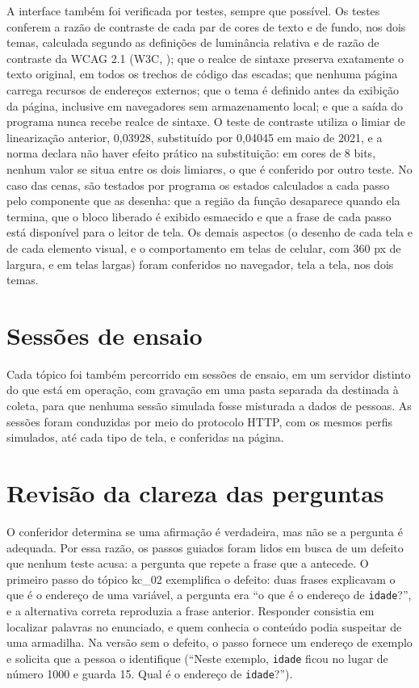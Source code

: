 A interface também foi verificada por testes, sempre que possível. Os testes conferem a razão de contraste de cada par de cores de texto e de fundo, nos dois temas, calculada segundo as definições de luminância relativa e de razão de contraste da WCAG 2.1 (W3C, \citeyear{w3c2025}); que o realce de sintaxe preserva exatamente o texto original, em todos os trechos de código das escadas; que nenhuma página carrega recursos de endereços externos; que o tema é definido antes da exibição da página, inclusive em navegadores sem armazenamento local; e que a saída do programa nunca recebe realce de sintaxe. O teste de contraste utiliza o limiar de linearização anterior, 0,03928, substituído por 0,04045 em maio de 2021, e a norma declara não haver efeito prático na substituição: em cores de 8 bits, nenhum valor se situa entre os dois limiares, o que é conferido por outro teste. No caso das cenas, são testados por programa os estados calculados a cada passo pelo componente que as desenha: que a região da função desaparece quando ela termina, que o bloco liberado é exibido esmaecido e que a frase de cada passo está disponível para o leitor de tela. Os demais aspectos (o desenho de cada tela e de cada elemento visual, e o comportamento em telas de celular, com 360 px de largura, e em telas largas) foram conferidos no navegador, tela a tela, nos dois temas.

\section{Sessões de ensaio}

Cada tópico foi também percorrido em sessões de ensaio, em um servidor distinto do que está em operação, com gravação em uma pasta separada da destinada à coleta, para que nenhuma sessão simulada fosse misturada a dados de pessoas. As sessões foram conduzidas por meio do protocolo HTTP, com os mesmos perfis simulados, até cada tipo de tela, e conferidas na página.

\section{Revisão da clareza das perguntas}

O conferidor determina se uma afirmação é verdadeira, mas não se a pergunta é adequada. Por essa razão, os passos guiados foram lidos em busca de um defeito que nenhum teste acusa: a pergunta que repete a frase que a antecede. O primeiro passo do tópico kc\_02 exemplifica o defeito: duas frases explicavam o que é o endereço de uma variável, a pergunta era ``o que é o endereço de \texttt{idade}?'', e a alternativa correta reproduzia a frase anterior. Responder consistia em localizar palavras no enunciado, e quem conhecia o conteúdo podia suspeitar de uma armadilha. Na versão sem o defeito, o passo fornece um endereço de exemplo e solicita que a pessoa o identifique (``Neste exemplo, \texttt{idade} ficou no lugar de número 1000 e guarda 15. Qual é o endereço de \texttt{idade}?'').

